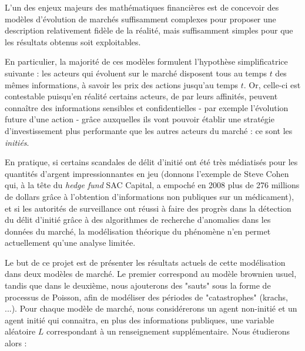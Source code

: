 \documentclass[../finalreport.tex]{subfiles}
\begin{document}
\par L'un des enjeux majeurs des mathématiques financières est de concevoir des modèles d'évolu\-tion de marchés suffisamment complexes pour proposer une description relativement fidèle de la réalité, mais suffisamment simples pour que les résultats obtenus soit exploitables.

\vspace{5mm}

\par En particulier, la majorité de ces modèles formulent l'hypothèse simplificatrice suivante : les acteurs qui évoluent sur le marché disposent tous au temps $t$ des mêmes informations, à savoir les prix des actions jusqu'au temps $t$. Or, celle-ci est contestable puisqu'en réalité certains acteurs, de par leurs affinités, peuvent connaître des informations sensibles et confidentielles - par exemple l'évolution future d'une action - grâce auxquelles ils vont pouvoir établir une stratégie d'investissement plus performante que les autres acteurs du marché : ce sont les \emph{initiés}. 

\vspace{5mm}

\par En pratique, si certains scandales de délit d'initié ont été très médiatisés pour les quantités d'argent impressionnantes en jeu (donnons l'exemple de Steve Cohen qui, à la tête du \emph{hedge fund} SAC Capital, a empoché en 2008 plus de 276 millions de dollars grâce à l'obtention d'informations non publiques sur un médicament), et si les autorités de surveillance ont réussi à faire des progrès dans la détection du délit d'initié grâce à des algorithmes de recherche d'anomalies dans les données du marché, la modélisation théorique du phénomène n'en permet actuellement qu'une analyse limitée.

\vspace{5mm}

\par Le but de ce projet est de présenter les résultats actuels de cette modélisation dans deux modèles de marché. Le premier correspond au modèle brownien usuel, tandis que dans le deuxième, nous ajouterons des "sauts" sous la forme de processus de Poisson, afin de modéliser des périodes de "catastrophes" (krachs, ...). Pour chaque modèle de marché, nous considére\-rons un agent non-initié et un agent initié qui connaitra, en plus des informations publiques, une variable aléatoire $L$ correspondant à un renseignement supplémentaire. Nous étudierons alors :
\end{document}
